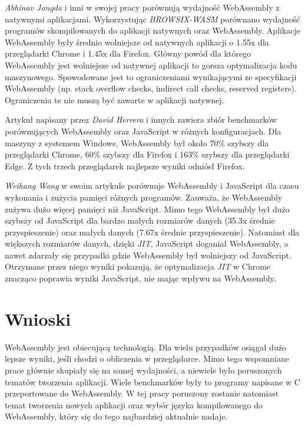 \documentclass[language=polish,type=master]{aghmodern}
\begin{document}
\emph{Abhinav Jangda} i inni w swojej pracy \cite{wasm_native} porównują wydajność WebAssembly z natywnymi aplikacjami.
Wykorzystując \emph{BROWSIX-WASM}\footnotemark{} porównano wydajność programów skompilowanych do aplikacji natywnych oraz WebAssembly.
Aplikacje WebAssembly były średnio wolniejsze od natywnych aplikacji o 1.55x dla przeglądarki Chrome i 1.45x dla Firefox.
Główny powód dla którego WebAssembly jest wolniejsze od natywnej aplikacji to gorsza optymalizacja kodu maszynowego.
Spowodowane jest to ograniczeniami wynikającymi ze specyfikacji WebAssembly (np. stack overflow checks, indirect call checks, reserved registers).
Ograniczenia te nie muszą być zawarte w aplikacji natywnej.

Artykuł \cite{wasm_js_bench} napisany przez \emph{David Herrera} i innych zawiera zbiór benchmarków porównujących WebAssembly oraz JavaScript w różnych konfiguracjach.
Dla maszyny z systemem Windows, WebAssembly był około 70\% szybszy dla przeglądarki Chrome, 60\% szybszy dla Firefox i 163\% szybszy dla przeglądarki Edge.
Z tych trzech przeglądarek najlepsze wyniki odniósł Firefox.

\emph{Weihang Wang} w swoim artykule \cite{wasm_js_bench2} porównuje WebAssembly i JavaScript dla czasu wykonania i zużycia pamięci różnych programów.
Zauważa, że WebAssembly zużywa dużo więcej pamięci niż JavaScript.
Mimo tego WebAssembly był dużo szybszy od JavaScript dla bardzo małych rozmiarów danych (35.3x średnie przyspieszenie) oraz małych danych (7.67x średnie przyspieszenie).
Natomiast dla większych rozmiarów danych, dzięki \emph{JIT}\footnotemark{}, JavaScript doganiał WebAssembly, a nawet zdarzały się przypadki gdzie WebAssembly był wolniejszy od JavaScript.
Otrzymane przez niego wyniki pokazują, że optymalizacja \emph{JIT} w Chrome znacząco poprawia wyniki JavaScript, nie mając wpływu na WebAssembly.

\section{Wnioski}
WebAssembly jest obiecującą technologią.
Dla wielu przypadków osiągał dużo lepsze wyniki, jeśli chodzi o obliczenia w przeglądarce.
Mimo tego wspomniane prace głównie skupiały się na samej wydajności, a niewiele było poruszonych tematów tworzenia aplikacji.
Wiele benchmarków były to programy napisane w C przeportowane\footnotemark{} do WebAssembly.
W tej pracy poruszony zostanie natomiast temat tworzenia nowych aplikacji oraz wybór języka kompilowanego do WebAssembly, który się do tego najbardziej aktualnie nadaje.
\end{document}
